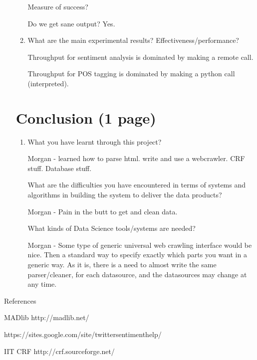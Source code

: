 \documentclass{article}
\begin{document}
\begin{enumerate}
\begin{enumerate}
    Measure of success?

    Do we get sane output? Yes.

  \item What are the main experimental results? Effectiveness/performance?

    Throughput for sentiment analysis is dominated by making a remote call.

    Throughput for POS tagging is dominated by making a python call (interpreted).

  \end{enumerate}

  \section{Conclusion (1 page)}
  \begin{enumerate}\item What you have learnt through this project?

    Morgan - learned how to parse html. write and use a webcrawler. CRF stuff. Database stuff.

    What are the difficulties you have encountered in terms of systems and algorithms in building the system to deliver the data products?

    Morgan - Pain in the butt to get and clean data.

    What kinds of Data Science tools/systems are needed?

    Morgan -
    Some type of generic universal web crawling interface would be nice.
    Then a standard way to specify exactly which parts you want in a generic way.
    As it is, there is a need to almost write the same parser/cleaner, for each datasource, and the datasources may change at any time.


  \end{enumerate}
\end{enumerate}

References

MADlib http://madlib.net/

https://sites.google.com/site/twittersentimenthelp/

IIT CRF http://crf.sourceforge.net/
\end{document}
